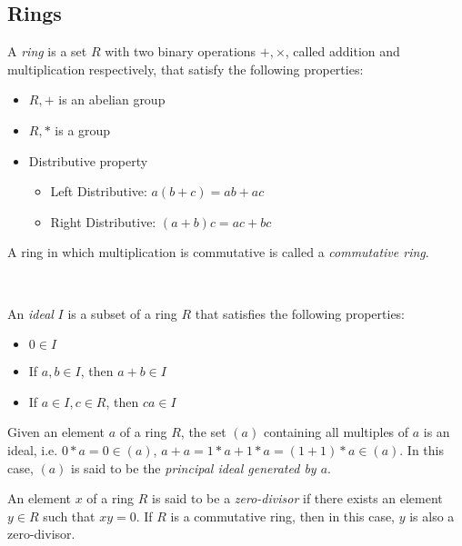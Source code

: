 \subsection{Rings}
\label{seq:rings}

\begin{definition}
  A \emph{ring} is a set $R$ with two binary operations $+, \times$, called addition and multiplication respectively, that satisfy the following properties:
  \begin{itemize}
  \item $R, +$ is an abelian group
  \item $R, *$ is a group
  \item Distributive property
    \begin{itemize}
    \item Left Distributive: $a(b + c) = ab + ac$
    \item Right Distributive: $(a + b)c = ac + bc$
    \end{itemize}
  \end{itemize}
\end{definition}

A ring in which multiplication is commutative is called a \emph{commutative ring}.

\leavevmode \\


\begin{definition}
  An \emph{ideal} $I$ is a subset of a ring $R$ that satisfies the following properties:
  \begin{itemize}
  \item $0 \in I$
  \item If $a, b \in I$, then $a + b \in I$
  \item If $a \in I, c \in R$, then $ca \in I$
  \end{itemize}
\end{definition}

Given an element $a$ of a ring $R$, the set $(a)$ containing all multiples of $a$ is an ideal, i.e. $0*a = 0 \in (a)$, $a + a = 1*a + 1*a = (1 + 1)*a \in (a)$. In this case, $(a)$ is said to be the \emph{principal ideal generated by $a$}.


\begin{definition}
  An element $x$ of a ring $R$ is said to be a \emph{zero-divisor} if there exists an element $y \in R$ such that $xy = 0$. If $R$ is a commutative ring, then in this case, $y$ is also a zero-divisor.
\end{definition}

